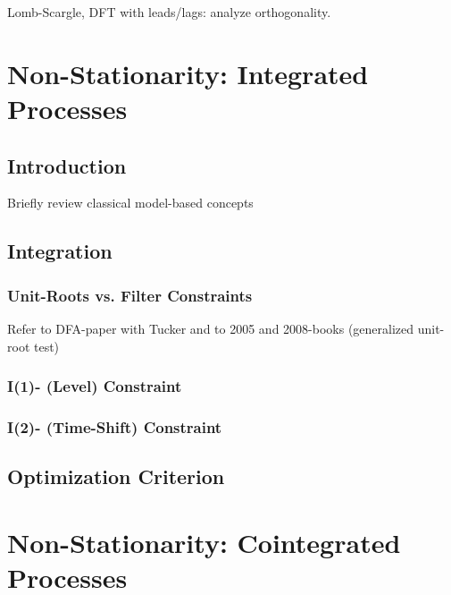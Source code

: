 \documentclass[a4paper]{book}
\begin{document}
Lomb-Scargle, DFT with leads/lags: analyze orthogonality.










\chapter{Non-Stationarity:  Integrated Processes}\label{int_sec}

\section{Introduction}

Briefly review classical model-based concepts

\section{Integration}

\subsection{Unit-Roots vs. Filter Constraints}

Refer to  DFA-paper with Tucker and to 2005 and 2008-books (generalized unit-root test) 

\subsection{I(1)- (Level) Constraint}

\subsection{I(2)- (Time-Shift) Constraint}
\section{Optimization Criterion}








\chapter{Non-Stationarity:  Cointegrated Processes}\label{coint_sec}
\end{document}
